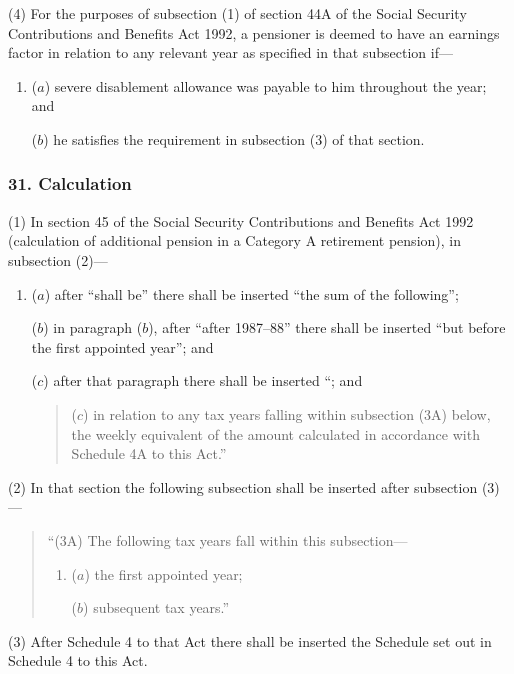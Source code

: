 \documentclass[12pt,a4paper]{article}
\begin{document}
(4) For the purposes of subsection (1)  of section 44A of the Social Security Contributions and Benefits Act 1992, a pensioner is deemed to have an earnings factor in relation to any relevant year as specified in that subsection if—
\begin{enumerate}\item[]
($a$) severe disablement allowance was payable to him throughout the year; and

($b$) he satisfies the requirement in subsection (3)  of that section.
\end{enumerate}


\subsubsection{31. Calculation}

(1) In section 45 of the Social Security Contributions and Benefits Act 1992 (calculation of additional pension in a Category A retirement pension), in subsection (2)—
\begin{enumerate}\item[]
($a$) after “shall be” there shall be inserted “the sum of the following”;

($b$) in paragraph ($b$), after “after 1987--88” there shall be inserted “but before the first appointed year”; and

($c$) after that paragraph there shall be inserted “; and
\begin{quotation}
($c$) in relation to any tax years falling within subsection (3A)  below, the weekly equivalent of the amount calculated in accordance with Schedule 4A to this Act.”
\end{quotation}
\end{enumerate}

(2) In that section the following subsection shall be inserted after subsection (3)—
\begin{quotation}
“(3A) The following tax years fall within this subsection—
\begin{enumerate}\item[]
($a$) the first appointed year;

($b$) subsequent tax years.”
\end{enumerate}
\end{quotation}

(3) After Schedule 4 to that Act there shall be inserted the Schedule set out in Schedule 4 to this Act.
\end{document}
